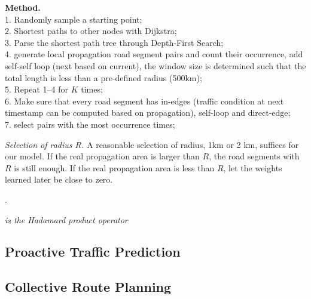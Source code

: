 {\bf Method.} \\
1. Randomly sample a starting point; \\
2. Shortest paths to other nodes with Dijkstra; \\
3. Parse the shortest path tree through Depth-First Search; \\
4. generate local propagation road segment pairs and count their occurrence, add self-self loop (next based on current), the window size is determined such that the total length is less than a pre-defined radius (500km); \\
5. Repeat 1--4 for $K$ times; \\
6. Make sure that every road segment has in-edges (traffic condition at next timestamp can be computed based on propagation), self-loop and direct-edge; \\
7. select pairs with the most occurrence times;

{\em Selection of radius $R$.} A reasonable selection of radius, \eg 1km or 2 km, suffices for our model. If the real propagation area is larger than $R$, the road segments with $R$ is still enough. If the real propagation area is less than $R$, let the weights learned later be close to zero.

.


{\em is the Hadamard product operator}

\subsection{Proactive Traffic Prediction}
\label{subsec-proactive}

\subsection{Collective Route Planning}
\label{subsec-route}


